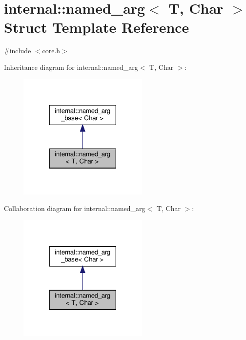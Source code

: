 \hypertarget{structinternal_1_1named__arg}{}\section{internal\+:\+:named\+\_\+arg$<$ T, Char $>$ Struct Template Reference}
\label{structinternal_1_1named__arg}


{\ttfamily \#include $<$core.\+h$>$}



Inheritance diagram for internal\+:\+:named\+\_\+arg$<$ T, Char $>$\+:
\nopagebreak
\begin{figure}[H]
\begin{center}
\leavevmode
\includegraphics[width=182pt]{structinternal_1_1named__arg__inherit__graph}
\end{center}
\end{figure}


Collaboration diagram for internal\+:\+:named\+\_\+arg$<$ T, Char $>$\+:
\nopagebreak
\begin{figure}[H]
\begin{center}
\leavevmode
\includegraphics[width=182pt]{structinternal_1_1named__arg__coll__graph}
\end{center}
\end{figure}
